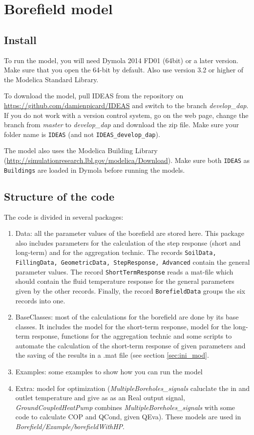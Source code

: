 \documentclass[a4paper,oneside,11pt]{report}
\begin{document}
\chapter*{Borefield model}

\section{Install}
To run the model, you will need Dymola 2014 FD01 (64bit) or a later version. Make sure that you open the 64-bit by default. Also use version 3.2 or higher of the Modelica Standard Library.


To download the model, pull IDEAS from the repository on \url{https://github.com/damienpicard/IDEAS} and switch to the branch \textit{develop\_dap}. If you do not work with a version control system, go on the web page, change the branch from \textit{master} to \textit{develop\_dap} and download the zip file. Make sure your folder name is {\tt IDEAS} (and not {\tt IDEAS\_develop\_dap}). 

The model also uses the Modelica Building Library (\url{http://simulationresearch.lbl.gov/modelica/Download}). Make sure both {\tt IDEAS} as {\tt Buildings} are loaded in Dymola before running the models.

\section{Structure of the code}
The code is divided in several packages:
\begin{enumerate}
\item Data: all the parameter values of the borefield are stored here. This package also includes parameters for the calculation of the step response (short and long-term) and for the aggregation technic. The records {\tt SoilData, FillingData, GeometricData, StepResponse, Advanced} contain the general parameter values. The record {\tt ShortTermResponse} reads a mat-file which should contain the fluid temperature response for the general parameters given by the other records. Finally, the record {\tt BorefieldData} groups the six records into one. 
\item BaseClasses: most of the calculations for the borefield are done by its base classes. It includes the model for the short-term response, model for the long-term response, functions for the aggregation technic and some scripts to automate the calculation of the short-term response of given parameters and the saving of the results in a .mat file (see section \ref{sec:ini_mod}.
\item Examples: some examples to show how you can run the model
\item Extra: model for optimization (\textit{MultipleBoreholes\_signals} caluclate the in and outlet temperature and give as as an Real output signal, \textit{GroundCoupledHeatPump} combines \textit{MultipleBoreholes\_signals} with some code to calculate COP and QCond, given QEva). These models are used in \textit{Borefield/Example/borefieldWithHP}.
\end{enumerate}
\end{document}
